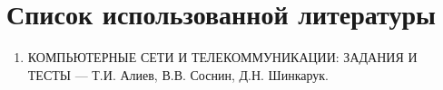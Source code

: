 \section{Список использованной литературы}
\begin{enumerate}
    \item КОМПЬЮТЕРНЫЕ СЕТИ И ТЕЛЕКОММУНИКАЦИИ: ЗАДАНИЯ И ТЕСТЫ --- Т.И. Алиев, В.В. Соснин, Д.Н. Шинкарук.
\end{enumerate}
